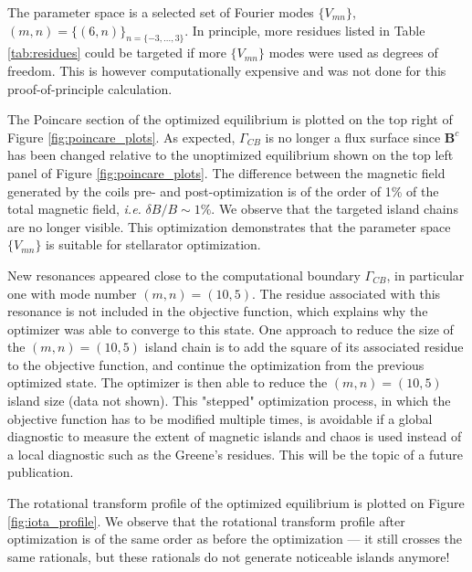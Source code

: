 \documentclass[my_thesis.tex]{subfiles}
\begin{document}
The parameter space is a selected set of Fourier modes $\{V_{mn}\}$,  $(m,n)=\{(6,n)\}_{n=\{-3,\ldots,3\}}$. In principle, more residues listed in Table \ref{tab:residues} could be targeted if more $\{V_{mn}\}$ modes were used as degrees of freedom. This is however computationally expensive and was not done for this proof-of-principle calculation.

The Poincare section of the optimized equilibrium is plotted on the top right of Figure \ref{fig:poincare_plots}. As expected, $\Gamma_{CB}$ is no longer a flux surface since $\mathbf{B}^c$ has been changed relative to the unoptimized equilibrium shown on the top left panel of Figure \ref{fig:poincare_plots}. The difference between the magnetic field generated by the coils pre- and post-optimization is of the order of 1\% of the total magnetic field, \textit{i.e.} $\delta B/B \sim 1\%$. We observe that the targeted island chains are no longer visible. This optimization demonstrates that the parameter space $\{V_{mn}\}$ is suitable for stellarator optimization.

New resonances appeared close to the computational boundary $\Gamma_{CB}$, in particular one with mode number $(m,n)=(10,5)$. The residue associated with this resonance is not included in the objective function, which explains why the optimizer was able to converge to this state. One approach to reduce the size of the $(m,n)=(10,5)$ island chain is to add the square of its associated residue to the objective function, and continue the optimization from the previous optimized state. The optimizer is then able to reduce the $(m,n)=(10,5)$ island size (data not shown). This "stepped" optimization process, in which the objective function has to be modified multiple times, is avoidable if a global diagnostic to measure the extent of magnetic islands and chaos is used instead of a local diagnostic such as the Greene's residues. This will be the topic of a future publication.


The rotational transform profile of the optimized equilibrium is plotted on Figure \ref{fig:iota_profile}. We observe that the rotational transform profile after optimization is of the same order as before the optimization --- it still crosses the same rationals, but these rationals do not generate noticeable islands anymore!
\end{document}
